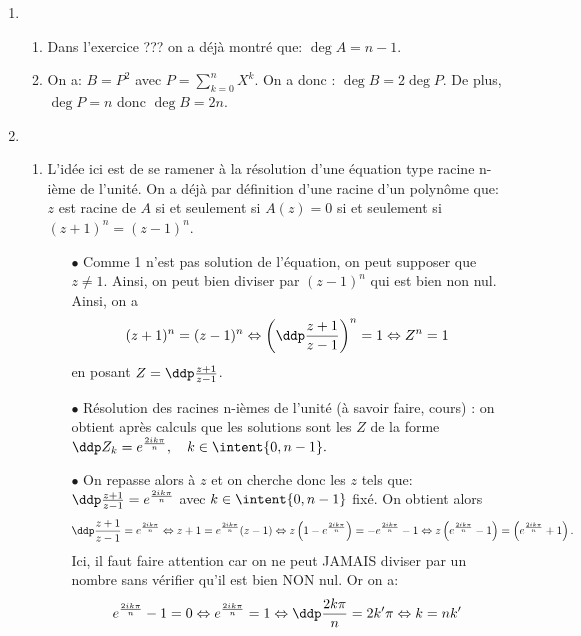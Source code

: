 \documentclass[a4paper, 11pt,reqno]{article}
\begin{document}
\begin{correction}  \;
	\begin{enumerate}
		\item
		      \begin{enumerate}
			      \item Dans l'exercice ??? on a d\'ej\`{a} montr\'e que: $\deg{A}=n-1$.
			      \item On a: $B=P^2$ avec $P=\sum\limits_{k=0}^n X^k$. On a donc : $\deg{B}=2\deg{P}$. De plus, $\deg{P}=n$ donc $\deg{B}=2n$.
		      \end{enumerate}
		\item
		      \begin{enumerate}
			      \item
			            L'id\'ee ici est de se ramener \`{a} la r\'esolution d'une \'equation type racine n-i\`{e}me de l'unit\'e. On a d\'ej\`{a} par d\'efinition d'une racine d'un polyn\^{o}me que: $z$ est racine de $A$ si et seulement si $A(z)=0$ si et seulement si $(z+1)^n=(z-1)^n$.
			            \begin{itemize}
				            \item[$\bullet$] Comme 1 n'est pas solution de l'\'equation, on peut supposer que $z\not= 1$. Ainsi, on peut bien diviser par $(z-1)^n$ qui est bien non nul. Ainsi, on a
				                  $$(z+1)^n=(z-1)^n\Leftrightarrow \left( \ddp\frac{z+1}{z-1}\right)^n=1\Leftrightarrow Z^n=1$$
				                  en posant $Z=\ddp\frac{z+1}{z-1}$.
				            \item[$\bullet$] R\'esolution des racines n-i\`{e}mes de l'unit\'e (\`a savoir faire, cours) : on obtient apr\`es calculs que les solutions sont les $Z$ de la forme $\ddp Z_k=e^{\frac{2ik\pi}{n}},\quad k\in\intent{ 0,n-1}.$
				            \item[$\bullet$] On repasse alors \`{a} $z$ et on cherche donc les $z$ tels que: $\ddp\frac{z+1}{z-1}=e^{\frac{2ik\pi}{n}}$ avec $k\in\intent{ 0,n-1}$ fix\'e. On obtient alors
				                  $$\ddp\frac{z+1}{z-1}=e^{\frac{2ik\pi}{n}}\Leftrightarrow z+1=e^{\frac{2ik\pi}{n}} (z-1)\Leftrightarrow z\left(1- e^{\frac{2ik\pi}{n}} \right)=-e^{\frac{2ik\pi}{n}}-1\Leftrightarrow z\left(e^{\frac{2ik\pi}{n}} -1\right)=\left( e^{\frac{2ik\pi}{n}}+1\right).$$
				                  Ici, il faut faire attention car on ne peut JAMAIS diviser par un nombre sans v\'erifier qu'il est bien NON nul. Or on a:
				                  $$e^{\frac{2ik\pi}{n}} -1=0\Leftrightarrow e^{\frac{2ik\pi}{n}} =1\Leftrightarrow \ddp\frac{2k\pi}{n}=2k^{\prime}\pi\Leftrightarrow k=nk^{\prime}$$

\end{itemize}
\end{enumerate}
\end{enumerate}
\end{correction}
\end{document}
